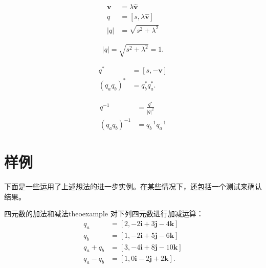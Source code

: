 \begin{tcolorbox}[breakable, enhanced,title = {范数}]
    $$
        \begin{aligned}
            \mathbf{v} & =\lambda \hat{\mathbf{v}}      \\
            q          & =[s, \lambda \hat{\mathbf{v}}] \\
            |q|        & =\sqrt{s^{2}+\lambda^{2}}
        \end{aligned}
    $$
\end{tcolorbox}

\begin{tcolorbox}[breakable, enhanced,title = {单位范数}]
    $$
        |q|=\sqrt{s^{2}+\lambda^{2}}=1 .
    $$
\end{tcolorbox}

\begin{tcolorbox}[breakable, enhanced,title = {共轭}]
    $$
        \begin{aligned}
            q^{*}                        & =[s,-\mathbf{v}]       \\
            \left(q_{a} q_{b}\right)^{*} & =q_{b}^{*} q_{a}^{*} .
        \end{aligned}
    $$
\end{tcolorbox}

\begin{tcolorbox}[breakable, enhanced,title = {逆}]
    $$
        \begin{aligned}
            q^{-1}                        & =\frac{q^{*}}{|q|^{2}} \\
            \left(q_{a} q_{b}\right)^{-1} & =q_{b}^{-1} q_{a}^{-1}
        \end{aligned}
    $$
\end{tcolorbox}

\section{样例}
下面是一些运用了上述想法的进一步实例。在某些情况下，还包括一个测试来确认结果。

\begin{myexample}{四元数的加法和减法}{theoexample}
对下列四元数进行加减运算：
$$
    \begin{aligned}
        q_{a}       & =[2,-2 \mathbf{i}+3 \mathbf{j}-4 \mathbf{k}]  \\
        q_{b}       & =[1,-2 \mathbf{i}+5 \mathbf{j}-6 \mathbf{k}]  \\
        q_{a}+q_{b} & =[3,-4 \mathbf{i}+8 \mathbf{j}-10 \mathbf{k}] \\
        q_{a}-q_{b} & =[1,0 \mathbf{i}-2 \mathbf{j}+2 \mathbf{k}] .
    \end{aligned}
$$
\end{myexample}

